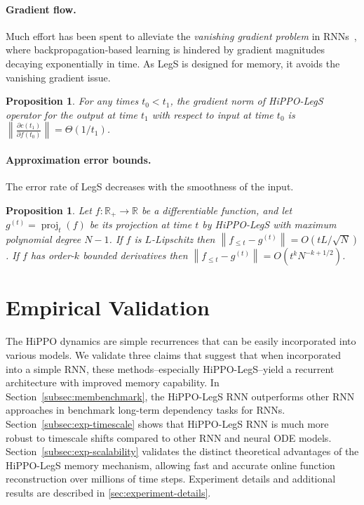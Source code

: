 \documentclass{article}
\newtheorem{proposition}[theorem]{Proposition}
\newcommand{\norm}[1]{\left\|{#1}\right\|} \providecommand{\abs}[1]{\left\lvert#1\right\rvert}
\DeclareMathOperator{\proj}{proj}
\begin{document}
\paragraph{Gradient flow.}
Much effort has been spent to alleviate the \emph{vanishing gradient problem} in RNNs~\cite{pascanu2013difficulty},
where backpropagation-based learning is hindered by gradient magnitudes decaying exponentially in time.
As LegS is designed for memory, it avoids the vanishing gradient issue.
\begin{proposition}\label{prop:gradient-bound}
    For any times $t_0 < t_1$, the gradient norm of HiPPO-LegS operator
    for the output at time $t_1$ with respect to input at time $t_0$ is
    $\left\| \frac{\partial c(t_1)}{\partial f(t_0)} \right\| = \Theta\left( 1/t_1 \right)$.
\end{proposition}


\paragraph{Approximation error bounds.}
The error rate of LegS decreases with the smoothness of the input.

\begin{proposition}\label{prop:approximation_error}
  Let $f \colon \mathbb{R}_+ \to \mathbb{R}$ be a differentiable function, and let
  $g^{(t)} = \proj_t(f)$ be its projection at time $t$ by
  HiPPO-LegS with maximum polynomial degree $N-1$.
  If $f$ is $L$-Lipschitz then $\norm{f_{\leq t} - g^{(t)}} = O(tL/\sqrt{N})$.
  If $f$ has order-$k$ bounded derivatives then
  $\norm{f_{\leq t} - g^{(t)}} = O(t^k N^{-k+1/2})$.
\end{proposition}

 

\section{Empirical Validation}
\label{sec:experiments}

The HiPPO dynamics are simple recurrences that can be easily incorporated into various models.
We validate three claims that suggest that when incorporated into a simple RNN, these methods--especially HiPPO-LegS--yield a recurrent architecture with improved memory capability.
In Section~\ref{subsec:membenchmark}, the HiPPO-LegS RNN outperforms
other RNN approaches in benchmark long-term dependency tasks for RNNs.
Section~\ref{subsec:exp-timescale} shows that HiPPO-LegS RNN is much more robust to
timescale shifts compared to other RNN and neural ODE models.
Section~\ref{subsec:exp-scalability} validates the distinct
theoretical advantages of the HiPPO-LegS memory mechanism, allowing fast and
accurate online function reconstruction over millions of time steps.
Experiment details and additional results are described in \cref{sec:experiment-details}.
\end{document}
